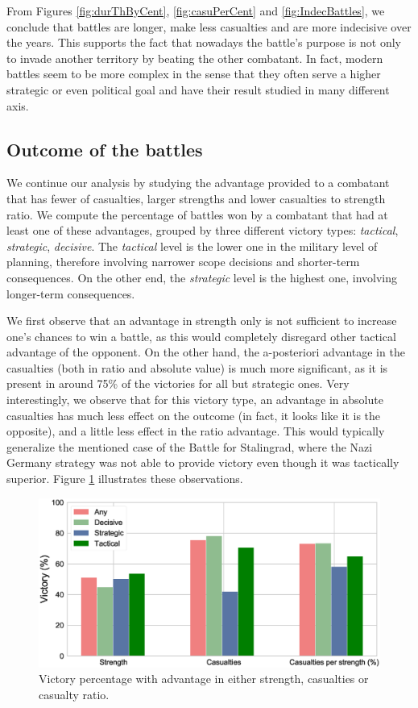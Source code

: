 From Figures \ref{fig:durThByCent}, \ref{fig:casuPerCent} and \ref{fig:IndecBattles}, we conclude that battles are longer, make less casualties and are more indecisive over the years. This supports the fact that nowadays the battle's purpose is not only to invade another territory by beating the other combatant. In fact, modern battles seem to be more complex in the sense that they often serve a higher strategic or even political goal and have their result studied in many different axis.

\subsection{Outcome of the battles}

We continue our analysis by studying the advantage provided to a combatant that has fewer of casualties, larger strengths  and  lower casualties to strength ratio. We compute the percentage of battles won by a combatant that had at least one of these advantages, grouped by three different victory types: \textit{tactical}, \textit{strategic},  \textit{decisive}. The \textit{tactical} level is the lower one in the military level of planning\cite{military_planning}, therefore involving narrower scope decisions and shorter-term consequences. On the other end, the \textit{strategic} level is the highest one, involving longer-term
consequences.

We first observe that an advantage in strength only is not sufficient to increase one's chances to win a battle, as this would completely disregard other tactical advantage of the opponent. On the other hand, the a-posteriori advantage in the casualties (both in ratio and absolute value) is much more significant, as it is present in around 75\% of the victories for all but strategic ones. Very interestingly, we observe that for this victory type, an advantage in absolute casualties has much less effect on the outcome (in fact, it looks like it is the opposite), and a little less effect in the ratio advantage. This would typically generalize the mentioned case of the Battle for Stalingrad, where the Nazi Germany strategy was not able to provide victory even though it was tactically superior. Figure \ref{fig:victoryAdvantage} illustrates these observations.

 \begin{figure}[h]
	\centering	\includegraphics[width=\linewidth]{figures/VictoryAdvantage}
	\caption{Victory percentage with advantage in either strength, casualties or casualty ratio.}\label{fig:victoryAdvantage}
	\centering
\end{figure}

